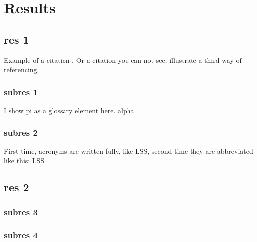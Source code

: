 \chapter{Results}
\section{res 1}

Example of a citation . Or a citation you can not see.   illustrate a third way of
referencing.
\subsection{subres 1}
I show \gls{pi} as a glossary element here. \gls{alpha}
\subsection{subres 2}
First time, acronyms are written fully, like \gls{LSS}, second time they are abbreviated like this: \gls{LSS}
\section{res 2}
\subsection{subres 3}
\subsection{subres 4}

